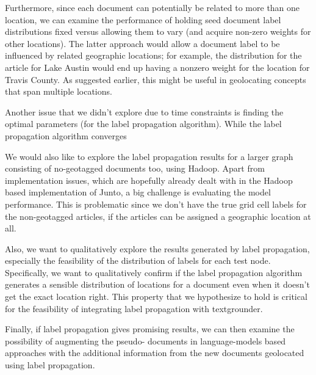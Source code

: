  
\par Furthermore, since each document can potentially be related to more than
one location, we can examine the performance of holding seed document label
distributions fixed versus allowing them to vary (and acquire non-zero weights
for other locations). The latter approach would allow a document label to be
influenced by related geographic locations;  for example, the distribution for
the article for Lake Austin would end up having a nonzero weight for the
location for Travis County. As suggested earlier, this might be useful in
geolocating concepts that span multiple locations.


\par Another issue that we didn't explore due to time constraints is finding the optimal parameters (for the label propagation algorithm). While the label propagation algorithm converges

\par We would also like to explore the label propagation results for a larger graph consisting of no-geotagged documents too, using
Hadoop. Apart from implementation issues, which are hopefully already dealt with in the Hadoop based implementation of Junto, a big challenge is evaluating the model performance. This is problematic since we don't have the true grid cell labels for the non-geotagged articles, if the articles can be assigned a geographic location at all.

\par Also, we want to qualitatively explore the results generated by label propagation, especially the feasibility  of the distribution of labels for each test node. Specifically, we want to qualitatively confirm if the label propagation algorithm generates a sensible distribution of locations for a document even when it doesn't get the exact location right. This property that we hypothesize to hold is critical for the feasibility of integrating label propagation with textgrounder.

\par Finally, if label propagation
gives promising results, we can then examine the possibility of augmenting the
pseudo- documents in language-models based approaches with the additional
information from the new documents geolocated using label propagation.

